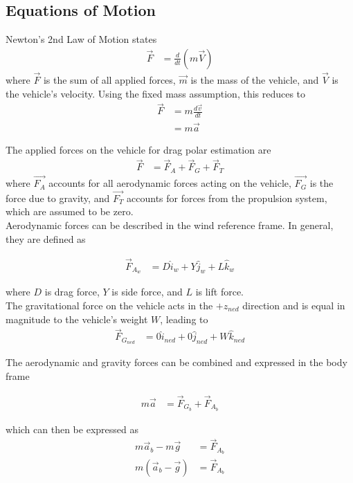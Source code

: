 \subsection*{Equations of Motion}
\label{sys-desc}
Newton's 2nd Law of Motion states
\begin{align}
\vec{F} &= \frac{d}{dt}(m\vec{V})
\end{align}
where $\vec{F}$ is the sum of all applied forces, $\vec{m}$ is the mass of the vehicle, and $\vec{V}$ is the vehicle's velocity. Using the fixed mass assumption, this reduces to 
\begin{align}
\vec{F} &= m\frac{d\vec{v}}{dt}\\
&= m\vec{a}
\end{align}

The applied forces on the vehicle for drag polar estimation are 
\begin{align}
\vec{F} &= \vec{F}_{A}+\vec{F}_{G}+\vec{F}_{T}
\end{align}
where $\vec{F_{A}}$ accounts for all aerodynamic forces acting on the vehicle, $\vec{F_{G}}$ is the force due to gravity, and $\vec{F_{T}}$ accounts for forces from the propulsion system, which are assumed to be zero.\\
Aerodynamic forces can be described in the wind reference frame. In general, they are defined as

\begin{align}
\vec{F}_{A_w} &= D \hat{i}_w+Y \hat{j}_w+L \hat{k}_w
\end{align}

where $D$ is drag force, $Y$ is side force, and $L$ is lift force.\\
The gravitational force on the vehicle acts in the $+z_{ned}$ direction and is equal in magnitude to the vehicle's weight $W$, leading to
\begin{align}
\vec{F}_{G_{ned}} &= 0\hat{i}_{ned}+0\hat{j}_{ned}+W\hat{k}_{ned}
\end{align}

The aerodynamic and gravity forces can be combined and expressed in the body frame

\begin{align}
m\vec{a} &= \vec{F}_{G_b} + \vec{F}_{A_b}
\end{align}

which can then be expressed as 
\begin{align}
m\vec{a}_b - m\vec{g} &= \vec{F}_{A_b}\\
m(\vec{a}_b - \vec{g}) &= \vec{F}_{A_b}
\label{accelerometerEqn}
\end{align}

